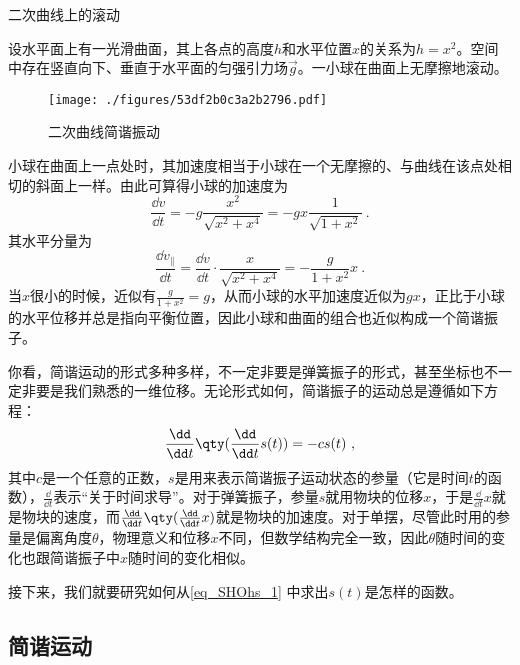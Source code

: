 \begin{example}{二次曲线上的滚动}

设水平面上有一光滑曲面，其上各点的高度$h$和水平位置$x$的关系为$h=x^2$。空间中存在竖直向下、垂直于水平面的匀强引力场$\vec{g}$。一小球在曲面上无摩擦地滚动。

\begin{figure}[ht]
\centering
\texttt{[image: ./figures/53df2b0c3a2b2796.pdf]}
\caption{二次曲线简谐振动} \label{fig_SHOhs_2}
\end{figure}

小球在曲面上一点处时，其加速度相当于小球在一个无摩擦的、与曲线在该点处相切的斜面上一样。由此可算得小球的加速度为
\begin{equation}
\frac{\dd v}{\dd t} = -g\frac{x^2}{\sqrt{x^2+x^4}} = -gx\frac{1}{\sqrt{1+x^2}}~. 
\end{equation}
其水平分量为
\begin{equation}
\frac{\dd v_\parallel}{\dd t} = \frac{\dd v}{\dd t}\cdot\frac{x}{\sqrt{x^2+x^4}} = -\frac{g}{1+x^2}x~. 
\end{equation}
当$x$很小的时候，近似有$\frac{g}{1+x^2}=g$，从而小球的水平加速度近似为$gx$，正比于小球的水平位移并总是指向平衡位置，因此小球和曲面的组合也近似构成一个简谐振子。

\end{example}


你看，简谐运动的形式多种多样，不一定非要是弹簧振子的形式，甚至坐标也不一定非要是我们熟悉的一维位移。无论形式如何，简谐振子的运动总是遵循如下方程：
\begin{equation}\label{eq_SHOhs_1}
\frac{\dd}{\dd t}\qty(\frac{\dd}{\dd t}s(t)) = -cs(t) ~, 
\end{equation}
其中$c$是一个任意的正数，$s$是用来表示简谐振子运动状态的参量（它是时间$t$的函数），$\frac{\dd}{\dd t}$表示“关于时间求导”。对于弹簧振子，参量$s$就用物块的位移$x$，于是$\frac{\dd}{\dd t}x$就是物块的速度，而$\frac{\dd}{\dd t}\qty(\frac{\dd}{\dd t}x)$就是物块的加速度。对于单摆，尽管此时用的参量是偏离角度$\theta$，物理意义和位移$x$不同，但数学结构完全一致，因此$\theta$随时间的变化也跟简谐振子中$x$随时间的变化相似。

接下来，我们就要研究如何从\autoref{eq_SHOhs_1} 中求出$s(t)$是怎样的函数。



\subsection{简谐运动}

